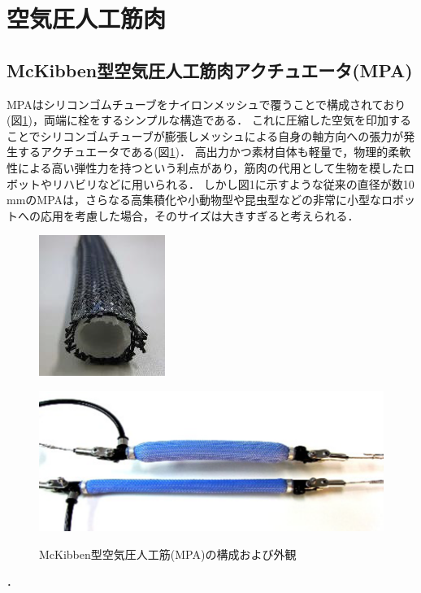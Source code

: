 \newpage
\section{空気圧人工筋肉}
\subsection{McKibben型空気圧人工筋肉アクチュエータ(MPA)}
MPAはシリコンゴムチューブをナイロンメッシュで覆うことで構成されており(図\ref{fig:MPA})，両端に栓をするシンプルな構造である．
これに圧縮した空気を印加することでシリコンゴムチューブが膨張しメッシュによる自身の軸方向への張力が発生するアクチュエータである(図\ref{fig:MPA})．
高出力かつ素材自体も軽量で，物理的柔軟性による高い弾性力を持つという利点があり，筋肉の代用として生物を模したロボットやリハビリなどに用いられる．
しかし図1に示すような従来の直径が数10 mmのMPAは，さらなる高集積化や小動物型や昆虫型などの非常に小型なロボットへの応用を考慮した場合，そのサイズは大きすぎると考えられる．
\begin{figure}[b]
    \begin{minipage}{0.49\columnwidth}
      \vspace{4mm}
      \centering
      \includegraphics[scale=1]{pic/MPA_kousei.png}
      \vspace{3mm}
      \label{fig:Structure}
    \end{minipage}
    \begin{minipage}{0.49\columnwidth}
      \vspace{25mm}
      \centering
      \includegraphics[scale=.8]{pic/MPA_dousa.png}
      \label{fig:move}
    \end{minipage}
    \caption{McKibben型空気圧人工筋(MPA)の構成および外観\cite{中西大輔2020}}
    \label{fig:MPA}
  \end{figure}．
